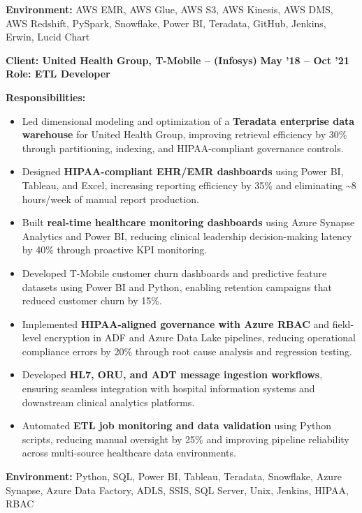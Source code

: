 \documentclass[a4paper,10pt]{article}
\begin{document}
\textbf{Environment:} AWS EMR, AWS Glue, AWS S3, AWS Kinesis, AWS DMS, AWS Redshift, PySpark, Snowflake, Power BI, Teradata, GitHub, Jenkins, Erwin, Lucid Chart

\vspace{1em}

\noindent \textbf{Client: United Health Group, T-Mobile – (Infosys)} \hfill \textbf{May '18 – Oct '21} \\
\textbf{Role: ETL Developer}

\textbf{Responsibilities:}
\begin{itemize}
    \item Led dimensional modeling and optimization of a \textbf{Teradata enterprise data warehouse} for United Health Group, improving retrieval efficiency by 30\% through partitioning, indexing, and HIPAA-compliant governance controls.
    \item Designed \textbf{HIPAA-compliant EHR/EMR dashboards} using Power BI, Tableau, and Excel, increasing reporting efficiency by 35\% and eliminating \textasciitilde 8 hours/week of manual report production.
    \item Built \textbf{real-time healthcare monitoring dashboards} using Azure Synapse Analytics and Power BI, reducing clinical leadership decision-making latency by 40\% through proactive KPI monitoring.
    \item Developed T-Mobile customer churn dashboards and predictive feature datasets using Power BI and Python, enabling retention campaigns that reduced customer churn by 15\%.
    \item Implemented \textbf{HIPAA-aligned governance with Azure RBAC} and field-level encryption in ADF and Azure Data Lake pipelines, reducing operational compliance errors by 20\% through root cause analysis and regression testing.
    \item Developed \textbf{HL7, ORU, and ADT message ingestion workflows}, ensuring seamless integration with hospital information systems and downstream clinical analytics platforms.
    \item Automated \textbf{ETL job monitoring and data validation} using Python scripts, reducing manual oversight by 25\% and improving pipeline reliability across multi-source healthcare data environments.
\end{itemize}

\textbf{Environment:} Python, SQL, Power BI, Tableau, Teradata, Snowflake, Azure Synapse, Azure Data Factory, ADLS, SSIS, SQL Server, Unix, Jenkins, HIPAA, RBAC
\end{document}
